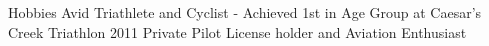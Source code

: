 \begin{category}{Hobbies}
\citembullet Avid Triathlete and Cyclist - Achieved 1st in Age Group at Caesar's Creek Triathlon 2011
\citembullet Private Pilot License holder and Aviation Enthusiast 
\end{category}
